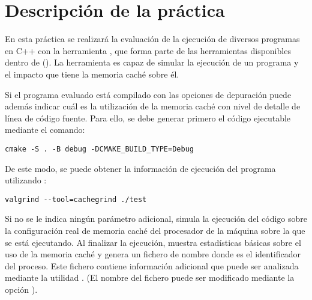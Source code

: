 \section{Descripción de la práctica}

En esta práctica se realizará la evaluación de la ejecución de diversos
programas en C++ con la herramienta , que forma parte de
las herramientas disponibles dentro de 
().  La herramienta es capaz de simular
la ejecución de un programa y el impacto que tiene la memoria caché sobre él. 

Si el programa evaluado está compilado con las opciones de depuración
 puede además
indicar cuál es la utilización de la memoria caché con nivel de detalle de
línea de código fuente.  Para ello, se debe generar primero el código
ejecutable mediante el comando:

\begin{lstlisting}[style=terminal,aboveskip=1em,belowskip=1em]
cmake -S . -B debug -DCMAKE_BUILD_TYPE=Debug
\end{lstlisting}

\vspace{1em}

De este modo, se puede obtener la información de ejecución del programa
utilizando :

\begin{lstlisting}[style=terminal,aboveskip=1em,belowskip=1em]
valgrind --tool=cachegrind ./test
\end{lstlisting}

\vspace{1em}

Si no se le indica ningún parámetro adicional,  simula
la ejecución del código sobre la configuración real de memoria caché del
procesador de la máquina sobre la que se está ejecutando. Al finalizar la
ejecución, muestra estadísticas básicas sobre el uso de la memoria caché y
genera un fichero de nombre  donde  es
el identificador del proceso. Este fichero contiene información adicional que
puede ser analizada mediante la utilidad . (El nombre del
fichero puede ser modificado mediante la opción
).

